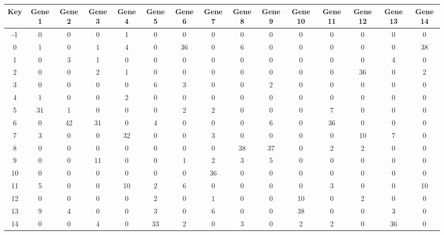 \begin{tabular}{|c|c|c|c|c|c|c|c|c|c|c|c|c|c|c|}
\hline
Key & Gene 1 & Gene 2 & Gene 3 & Gene 4 & Gene 5 & Gene 6 & Gene 7 & Gene 8 & Gene 9 & Gene 10 & Gene 11 & Gene 12 & Gene 13 & Gene 14 \\
\hline
-1 & 0 & 0 & 0 & 1 & 0 & 0 & 0 & 0 & 0 & 0 & 0 & 0 & 0 & 0 \\
0 & 1 & 0 & 1 & 4 & 0 & 36 & 0 & 6 & 0 & 0 & 0 & 0 & 0 & 38 \\
1 & 0 & 3 & 1 & 0 & 0 & 0 & 0 & 0 & 0 & 0 & 0 & 0 & 4 & 0 \\
2 & 0 & 0 & 2 & 1 & 0 & 0 & 0 & 0 & 0 & 0 & 0 & 36 & 0 & 2 \\
3 & 0 & 0 & 0 & 0 & 6 & 3 & 0 & 0 & 2 & 0 & 0 & 0 & 0 & 0 \\
4 & 1 & 0 & 0 & 2 & 0 & 0 & 0 & 0 & 0 & 0 & 0 & 0 & 0 & 0 \\
5 & 31 & 1 & 0 & 0 & 0 & 2 & 2 & 0 & 0 & 0 & 7 & 0 & 0 & 0 \\
6 & 0 & 42 & 31 & 0 & 4 & 0 & 0 & 0 & 6 & 0 & 36 & 0 & 0 & 0 \\
7 & 3 & 0 & 0 & 32 & 0 & 0 & 3 & 0 & 0 & 0 & 0 & 10 & 7 & 0 \\
8 & 0 & 0 & 0 & 0 & 0 & 0 & 0 & 38 & 37 & 0 & 2 & 2 & 0 & 0 \\
9 & 0 & 0 & 11 & 0 & 0 & 1 & 2 & 3 & 5 & 0 & 0 & 0 & 0 & 0 \\
10 & 0 & 0 & 0 & 0 & 0 & 0 & 36 & 0 & 0 & 0 & 0 & 0 & 0 & 0 \\
11 & 5 & 0 & 0 & 10 & 2 & 6 & 0 & 0 & 0 & 0 & 3 & 0 & 0 & 10 \\
12 & 0 & 0 & 0 & 0 & 2 & 0 & 1 & 0 & 0 & 10 & 0 & 2 & 0 & 0 \\
13 & 9 & 4 & 0 & 0 & 3 & 0 & 6 & 0 & 0 & 38 & 0 & 0 & 3 & 0 \\
14 & 0 & 0 & 4 & 0 & 33 & 2 & 0 & 3 & 0 & 2 & 2 & 0 & 36 & 0 \\
\hline
\end{tabular}